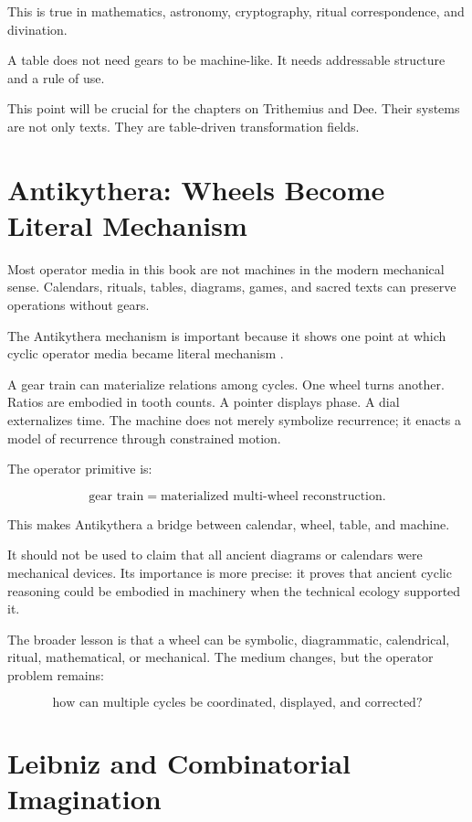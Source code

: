 \documentclass[11pt]{book}
\begin{document}
This is true in mathematics, astronomy, cryptography, ritual correspondence, and divination.

A table does not need gears to be machine-like. It needs addressable structure and a rule of use.

This point will be crucial for the chapters on Trithemius and Dee. Their systems are not only texts. They are table-driven transformation fields.

\section{Antikythera: Wheels Become Literal Mechanism}

Most operator media in this book are not machines in the modern mechanical sense. Calendars, rituals, tables, diagrams, games, and sacred texts can preserve operations without gears.

The Antikythera mechanism is important because it shows one point at which cyclic operator media became literal mechanism \cite{Freeth2006Antikythera,Freeth2021Antikythera}.

A gear train can materialize relations among cycles. One wheel turns another. Ratios are embodied in tooth counts. A pointer displays phase. A dial externalizes time. The machine does not merely symbolize recurrence; it enacts a model of recurrence through constrained motion.

The operator primitive is:

\[
\text{gear train} = \text{materialized multi-wheel reconstruction}.
\]

This makes Antikythera a bridge between calendar, wheel, table, and machine.

It should not be used to claim that all ancient diagrams or calendars were mechanical devices. Its importance is more precise: it proves that ancient cyclic reasoning could be embodied in machinery when the technical ecology supported it.

The broader lesson is that a wheel can be symbolic, diagrammatic, calendrical, ritual, mathematical, or mechanical. The medium changes, but the operator problem remains:

\[
\text{how can multiple cycles be coordinated, displayed, and corrected?}
\]

\section{Leibniz and Combinatorial Imagination}
\end{document}
